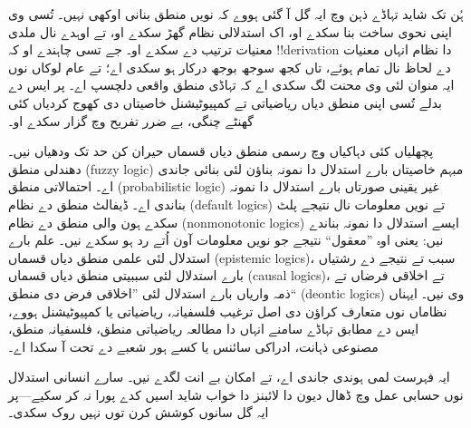 \documentclass[../../../include/open-logic-section]{subfiles}
\begin{document}


ہُن تک شاید تہاڈے ذہن وچ ایہ گل آ گئی ہووے کہ نویں منطق بنانی اوکھی نہیں۔
تُسی وی اپنی نحوی ساخت بنا سکدے او، اک استدلالی نظام گھڑ سکدے او، تے اوہدے
نال ملدی معنیات ترتیب دے سکدے او۔ جے تسی چاہندے او کہ !!{derivation}
دا نظام انہاں معنیات دے لحاظ نال تمام ہوئے، تاں کجھ سوجھ بوجھ درکار ہو
سکدی اے؛ تے عام لوکاں نوں ایہ منوان لئی وی محنت لگ سکدی اے کہ تہاڈی
منطق واقعی دلچسپ اے۔ پر ایس دے بدلے تُسی اپنی منطق دیاں ریاضیاتی تے
کمپیوٹیشنل خاصیتاں دی کھوج کردیاں کئی گھنٹے چنگی، بے ضرر تفریح وچ
گزار سکدے او۔

پچھلیاں کئی دہاکیاں وچ رسمی منطق دیاں قسماں حیران کن حد تک ودھیاں نیں۔
دھندلی منطق (fuzzy logic) مبہم خاصیتاں بارے استدلال دا نمونہ بناؤن لئی
بنائی جاندی اے۔ احتمالاتی منطق (probabilistic logic) غیر یقینی صورتاں
بارے استدلال دا نمونہ بناندی اے۔ ڈیفالٹ منطق دے نظام (default logics)
تے نویں معلومات نال نتیجے پلٹ سکدے ہون والی منطق دے نظام
(nonmonotonic logics) ایسے استدلال دا نمونہ بناندے نیں: یعنی اوہ ”معقول“ نتیجے جو نویں
معلومات آون اُتے رد ہو سکدے نیں۔ علم بارے استدلال لئی علمی منطق دیاں
قسماں (epistemic logics)، سبب تے نتیجے دے رشتیاں بارے استدلال لئی
سببیتی منطق دیاں قسماں (causal logics)، تے اخلاقی فرضاں تے ذمہ واریاں
بارے استدلال لئی ”اخلاقی فرض دی منطق“ (deontic logics) وی نیں۔ ایہناں
نظاماں نوں متعارف کراؤن دی اصل ترغیب فلسفیانہ، ریاضیاتی یا
کمپیوٹیشنل ہووے، ایس دے مطابق تہاڈے سامنے انہاں دا مطالعہ ریاضیاتی
منطق، فلسفیانہ منطق، مصنوعی ذہانت، ادراکی سائنس یا کسے ہور شعبے دے
تحت آ سکدا اے۔

ایہ فہرست لمی ہوندی جاندی اے، تے امکان بے انت لگدے نیں۔ سارے انسانی
استدلال نوں حسابی عمل وچ ڈھال دیون دا لائبنز دا خواب شاید اسیں کدے
پورا نہ کر سکیے---پر ایہ گل سانوں کوشش کرن توں نہیں روک سکدی۔
\end{document}
